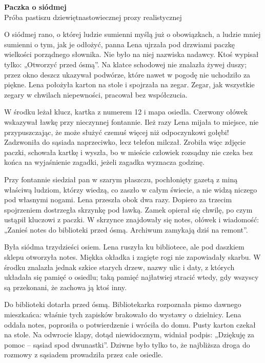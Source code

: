 \documentclass[a4paper,11pt]{article}
\begin{document}
\begin{center}
  {\Large\bfseries Paczka o siódmej}\\[0.3em]
  {\small Próba pastiszu dziewiętnastowiecznej prozy realistycznej}
\end{center}

O siódmej rano, o której ludzie sumienni myślą już o obowiązkach,
a ludzie mniej sumienni o tym, jak je odłożyć, panna Lena ujrzała
pod drzwiami paczkę wielkości porządnego słownika. Nie było na niej
nazwiska nadawcy. Ktoś wypisał tylko: „Otworzyć przed ósmą”.
Na klatce schodowej nie znalazła żywej duszy; przez okno deszcz
ukazywał podwórze, które nawet w pogodę nie uchodziło za piękne.
Lena położyła karton na stole i spojrzała na zegar. Zegar, jak
wszystkie zegary w chwilach niepewności, pracował bez współczucia.

W środku leżał klucz, kartka z numerem 12 i mapa osiedla. Czerwony
ołówek wskazywał ławkę przy nieczynnej fontannie. Ileż razy Lena
mijała to miejsce, nie przypuszczając, że może służyć czemuś więcej
niż odpoczynkowi gołębi! Zadzwoniła do sąsiada naprzeciwko, lecz
telefon milczał. Zrobiła więc zdjęcie paczki, schowała kartkę i
wyszła, bo w mieście człowiek rozsądny nie czeka bez końca na
wyjaśnienie zagadki, jeżeli zagadka wyznacza godzinę.

Przy fontannie siedział pan w szarym płaszczu, pochłonięty gazetą
z miną właściwą ludziom, którzy wiedzą, co zaszło w całym świecie,
a nie widzą niczego pod własnymi nogami. Lena przeszła obok dwa razy.
Dopiero za trzecim spojrzeniem dostrzegła skrzynkę pod ławką.
Zamek opierał się chwilę, po czym ustąpił kluczowi z paczki.
W skrzynce znajdowały się notes, ołówek i wiadomość: „Zanieś notes
do biblioteki przed ósmą. Archiwum zamykają dziś na remont”.

Była siódma trzydzieści osiem. Lena ruszyła ku bibliotece, ale pod
daszkiem sklepu otworzyła notes. Miękka okładka i zagięte rogi nie
zapowiadały skarbu. W środku znalazła jednak szkice starych drzew,
nazwy ulic i daty, z których układała się pamięć o osiedlu;
taką pamięć najłatwiej stracić wtedy, gdy wszyscy są przekonani,
że zachowa ją ktoś inny.

Do biblioteki dotarła przed ósmą. Bibliotekarka rozpoznała pismo
dawnego mieszkańca: właśnie tych zapisków brakowało do wystawy
o dzielnicy. Lena oddała notes, poprosiła o potwierdzenie i wróciła
do domu. Pusty karton czekał na stole. Na odwrocie klapy, dotąd
niewidocznym, widniał podpis: „Dziękuję za pomoc -- sąsiad spod
dwunastki”. Dziwne było tylko to, że najbliższa droga do rozmowy
z sąsiadem prowadziła przez całe osiedle.
\end{document}
